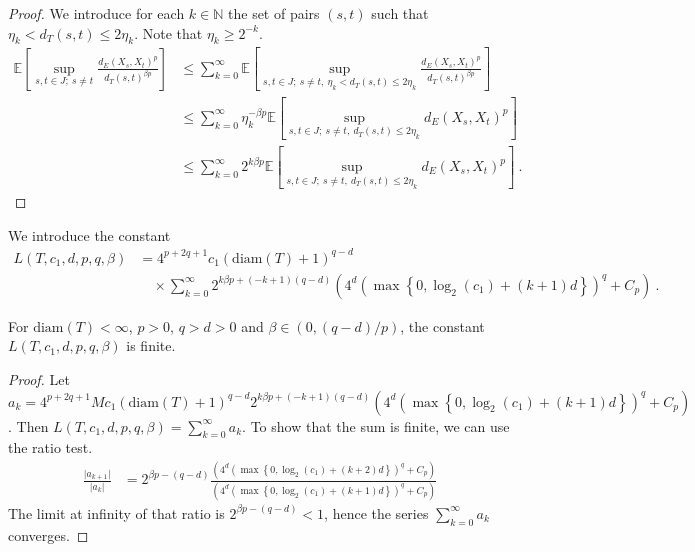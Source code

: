 \begin{proof}
We introduce for each $k \in \mathbb{N}$ the set of pairs $(s, t)$ such that $\eta_k < d_T(s, t) \le 2 \eta_k$.
Note that $\eta_k \ge 2^{-k}$.
\begin{align*}
  \mathbb{E}\left[ \sup_{s, t \in J;\: s \ne t} \frac{d_E(X_s, X_t)^p}{d_T(s, t)^{\beta p}} \right]
  &\le \sum_{k=0}^\infty \mathbb{E}\left[ \sup_{s, t \in J;\: s \ne t, \: \eta_k < d_T(s, t) \le 2 \eta_k} \frac{d_E(X_s, X_t)^p}{d_T(s, t)^{\beta p}} \right]
  \\
  &\le \sum_{k=0}^\infty \eta_k^{-\beta p} \mathbb{E}\left[ \sup_{s, t \in J;\: s \ne t, \: d_T(s, t) \le 2 \eta_k} d_E(X_s, X_t)^p \right]
  \\
  &\le \sum_{k=0}^\infty 2^{k \beta p} \mathbb{E}\left[ \sup_{s, t \in J;\: s \ne t, \: d_T(s, t) \le 2 \eta_k} d_E(X_s, X_t)^p \right]
  \: .
\end{align*}
\end{proof}


\begin{definition}\label{def:L}
  \leanok
We introduce the constant
\begin{align*}
  L(T, c_1, d, p, q, \beta)
  &= 4^{p+2q+1} c_1 (\mathrm{diam}(T)+1)^{q-d}
  \\&\quad \times \sum_{k=0}^\infty 2^{k \beta p + (-k + 1)(q-d)}\left(4^d \left(\max\left\{0, \log_2(c_1) + (k + 1)d \right\}\right)^q
    + C_p\right)
  \: .
\end{align*}
\end{definition}


\begin{lemma}\label{lem:L_lt_top}
  \leanok
For $\mathrm{diam}(T) < \infty$, $p> 0$, $q > d > 0$ and $\beta \in (0, (q-d)/p)$, the constant $L(T, c_1, d, p, q, \beta)$ is finite.
\end{lemma}

\begin{proof}
Let $a_k = 4^{p+2q+1} M c_1 (\mathrm{diam}(T)+1)^{q-d} 2^{k \beta p + (-k + 1)(q-d)} \left(4^d \left(\max\left\{0, \log_2(c_1) + (k + 1)d \right\}\right)^q
    + C_p\right)$.
Then $L(T, c_1, d, p, q, \beta) = \sum_{k=0}^\infty a_k$.
To show that the sum is finite, we can use the ratio test.
\begin{align*}
  \frac{\vert a_{k+1} \vert}{\vert a_k \vert}
  &= 2^{\beta p - (q - d)}
    \frac{\left(4^d \left(\max\left\{0, \log_2(c_1) + (k + 2)d \right\}\right)^q + C_p\right)}
    {\left(4^d \left(\max\left\{0, \log_2(c_1) + (k + 1)d \right\}\right)^q + C_p\right)}
\end{align*}
The limit at infinity of that ratio is $2^{\beta p - (q - d)} < 1$, hence the series $\sum_{k=0}^\infty a_k$ converges.
\end{proof}


